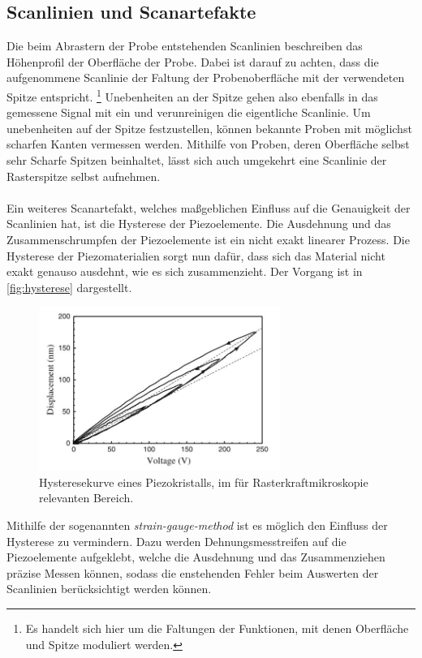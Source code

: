 \subsection{Scanlinien und Scanartefakte}
Die beim Abrastern der Probe entstehenden Scanlinien beschreiben das Höhenprofil der Oberfläche der Probe. Dabei ist darauf zu achten, dass die aufgenommene Scanlinie der Faltung der Probenoberfläche mit der verwendeten Spitze entspricht. \footnote{Es handelt sich hier um die Faltungen der Funktionen, mit denen Oberfläche und Spitze moduliert werden.} Unebenheiten an der Spitze gehen also ebenfalls in das gemessene Signal mit ein und verunreinigen die eigentliche Scanlinie. Um unebenheiten auf der Spitze festzustellen, können bekannte Proben mit möglichst scharfen Kanten vermessen werden. Mithilfe von Proben, deren Oberfläche selbst sehr Scharfe Spitzen beinhaltet, lässt sich auch umgekehrt eine Scanlinie der Rasterspitze selbst aufnehmen.\\
\\
Ein weiteres Scanartefakt, welches maßgeblichen Einfluss auf die Genauigkeit der Scanlinien hat, ist die Hysterese der Piezoelemente. Die Ausdehnung und das Zusammenschrumpfen der Piezoelemente ist ein nicht exakt linearer Prozess. Die Hysterese der Piezomaterialien sorgt nun dafür, dass sich das Material nicht exakt genauso ausdehnt, wie es sich zusammenzieht. Der Vorgang ist in \autoref{fig:hysterese} dargestellt.
\begin{figure}[H]
  \includegraphics[width=0.7\textwidth]{content/plots/hysterese.jpg}
  \caption{Hysteresekurve eines Piezokristalls, im für Rasterkraftmikroskopie relevanten Bereich. \cite{Voigt}}
  \label{fig:hysterese}
\end{figure}
Mithilfe der sogenannten \textit{strain-gauge-method} ist es möglich den Einfluss der Hysterese zu vermindern. Dazu werden Dehnungsmesstreifen auf die Piezoelemente aufgeklebt, welche die Ausdehnung und das Zusammenziehen präzise Messen können, sodass die enstehenden Fehler beim Auswerten der Scanlinien berücksichtigt werden können.\\
